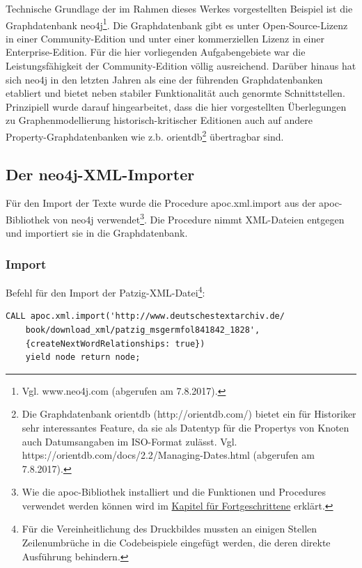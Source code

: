 \documentclass[ngerman,]{scrreprt}
\begin{document}
Technische Grundlage der im Rahmen dieses Werkes vorgestellten Beispiel ist die Graphdatenbank neo4j\footnote{Vgl. www.neo4j.com (abgerufen am 7.8.2017).}. Die Graphdatenbank gibt es unter Open-Source-Lizenz in einer Community-Edition und unter einer kommerziellen Lizenz in einer Enterprise-Edition. Für die hier vorliegenden Aufgabengebiete war die Leistungsfähigkeit der Community-Edition völlig ausreichend. Darüber hinaus hat sich neo4j in den letzten Jahren als eine der führenden Graphdatenbanken etabliert und bietet neben stabiler Funktionalität auch genormte Schnittstellen. Prinzipiell wurde darauf hingearbeitet, dass die hier vorgestellten Überlegungen zu Graphenmodellierung historisch-kritischer Editionen auch auf andere Property-Graphdatenbanken wie z.b. orientdb\footnote{Die Graphdatenbank orientdb (http://orientdb.com/) bietet ein für Historiker sehr interessantes Feature, da sie als Datentyp für die Propertys von Knoten auch Datumsangaben im ISO-Format zulässt. Vgl. https://orientdb.com/docs/2.2/Managing-Dates.html (abgerufen am 7.8.2017).} übertragbar sind.

\subsection{Der neo4j-XML-Importer}\label{der-neo4j-xml-importer}

Für den Import der Texte wurde die Procedure apoc.xml.import aus der apoc-Bibliothek von neo4j verwendet\footnote{Wie die apoc-Bibliothek installiert und die Funktionen und Procedures verwendet werden können wird im \href{85-cypher-fuer-Fortgeschrittene.md}{Kapitel für Fortgeschrittene} erklärt.}. Die Procedure nimmt XML-Dateien entgegen und importiert sie in die Graphdatenbank.

\subsubsection{Import}\label{import}

Befehl für den Import der Patzig-XML-Datei\footnote{Für die Vereinheitlichung des Druckbildes mussten an einigen Stellen Zeilenumbrüche in die Codebeispiele eingefügt werden, die deren direkte Ausführung behindern.}:

\begin{verbatim}
CALL apoc.xml.import('http://www.deutschestextarchiv.de/
    book/download_xml/patzig_msgermfol841842_1828',
    {createNextWordRelationships: true})    
    yield node return node;
\end{verbatim}
\end{document}
